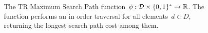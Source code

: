     \begin{figure}
            \centering
            \begin{pcvstack}[boxed,center,space=0.5em]
            \end{pcvstack}
      \caption[Treap Maximum Search Path.]{The TR Maximum Search Path function~$\phi : \mathcal{D} \times \{0,1 \}^{*} \rightarrow  \mathbb{R}$. The function performs an in-order traversal for all elements~$d \in D$, returning the longest search path cost among them.
      } 
      \label{fig:t-cost}
\end{figure}
    
